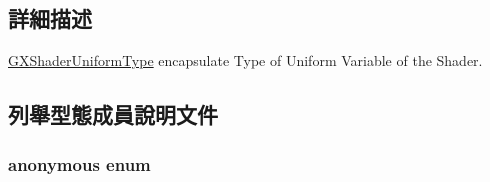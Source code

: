\subsection{詳細描述}
\hyperlink{class_i_dream_sky_1_1_g_x_shader_uniform_type}{G\+X\+Shader\+Uniform\+Type} encapsulate Type of Uniform Variable of the Shader. 

\subsection{列舉型態成員說明文件}
\subsubsection[{\texorpdfstring{anonymous enum}{anonymous enum}}]{\setlength{\rightskip}{0pt plus 5cm}anonymous enum}\hypertarget{class_i_dream_sky_1_1_g_x_shader_uniform_type_ae17ebbaaa2f0bc41b101334f3d6ba7d3}{}\label{class_i_dream_sky_1_1_g_x_shader_uniform_type_ae17ebbaaa2f0bc41b101334f3d6ba7d3}
